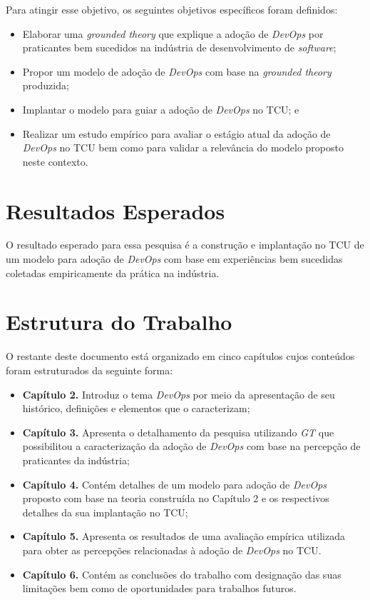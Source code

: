 Para atingir esse objetivo, os seguintes objetivos específicos foram definidos:

\begin{itemize}
\item Elaborar uma \textit{grounded theory} que explique a adoção
de \textit{DevOps} por praticantes bem sucedidos na indústria de desenvolvimento
de \textit{software};
\item Propor um modelo de adoção de \textit{DevOps} com base na
\textit{grounded theory} produzida;
\item Implantar o modelo para guiar a adoção de \textit{DevOps} no \acrshort{TCU}; e
\item Realizar um estudo empírico para avaliar o estágio atual da adoção de
\textit{DevOps} no \acrshort{TCU} bem como para validar a relevância do modelo
proposto neste contexto.
\end{itemize}

\section{Resultados Esperados}
O resultado esperado para essa pesquisa é a construção e implantação no
\acrshort{TCU} de um modelo para adoção de \textit{DevOps} com base em
experiências bem sucedidas coletadas empiricamente da prática na indústria.

\section{Estrutura do Trabalho}

O restante deste documento está organizado em cinco capítulos cujos conteúdos
foram estruturados da seguinte forma:

\begin{itemize}
\item \textbf{Capítulo 2.} Introduz o tema \textit{DevOps} por meio da
apresentação de seu histórico, definições e elementos que o caracterizam;
\item \textbf{Capítulo 3.} Apresenta o detalhamento da pesquisa utilizando
\textit{\acrfull{GT}} que possibilitou a caracterização da adoção de
\textit{DevOps} com base na percepção de praticantes da indústria;
\item \textbf{Capítulo 4.} Contém detalhes de um modelo para adoção de
\textit{DevOps} proposto com base na teoria construída no Capítulo 2 e os
respectivos detalhes da sua implantação no \acrshort{TCU};
\item \textbf{Capítulo 5.} Apresenta os resultados de uma avaliação empírica
utilizada para obter as percepções relacionadas à adoção de \textit{DevOps} no
\acrshort{TCU}.
\item \textbf{Capítulo 6.} Contém as conclusões do trabalho com designação
das suas limitações bem como de oportunidades para trabalhos futuros.
\end{itemize}


